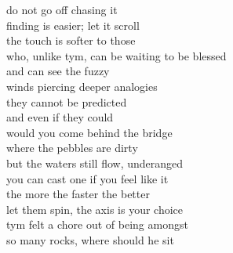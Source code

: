 do not go off chasing it\\
finding is easier; let it scroll\\
the touch is softer to those\\
who, unlike tym, can be waiting to be blessed\\
and can see the fuzzy\\
winds piercing deeper analogies\\

they cannot be predicted\\
and even if they could\\
would you come behind the bridge\\
where the pebbles are dirty\\
but the waters still flow, underanged\\

you can cast one if you feel like it\\
the more the faster the better\\
let them spin, the axis is your choice\\
tym felt a chore out of being amongst\\
so many rocks, where should he sit
